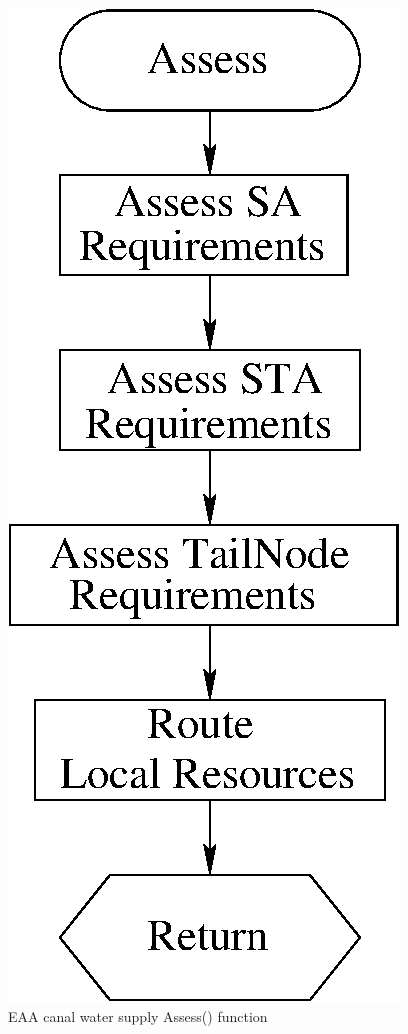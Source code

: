 \begin{figure}[!htb]
 \begin{center}
  \includegraphics[scale=.5]{Graphics/eaaCanalWS}
  \caption{\label{fig:eaaCanalWS} EAA canal water supply Assess() function}
 \end{center}
\end{figure}

